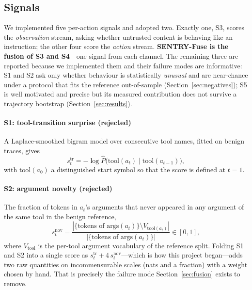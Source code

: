 \documentclass[preprint,12pt,number]{elsarticle}
\theoremstyle{definition}
\begin{document}
\subsection{Signals}\label{sec:signals}

We implemented five per-action signals and adopted two. Exactly one, S3, scores the
\emph{observation} stream, asking whether untrusted content is behaving like an
instruction; the other four score the \emph{action} stream.
\textbf{SENTRY-Fuse is the fusion of S3 and S4}---one signal from each channel.
The remaining three are reported because we implemented them and their failure
modes are informative: S1 and S2 ask only whether behaviour is statistically \emph{unusual}
and are near-chance under a protocol that fits the reference out-of-sample
(Section~\ref{sec:negatives}); S5 is well motivated and precise but its measured
contribution does not survive a trajectory bootstrap (Section~\ref{sec:results}).

\paragraph{S1: tool-transition surprise (rejected)}
A Laplace-smoothed bigram model over consecutive tool names, fitted on benign
traces, gives
\begin{equation}
s^{\mathrm{tr}}_t = -\log \hat{P}\big(\mathrm{tool}(a_t) \mid \mathrm{tool}(a_{t-1})\big),
\end{equation}
with $\mathrm{tool}(a_0)$ a distinguished start symbol so that the score is
defined at $t=1$.

\paragraph{S2: argument novelty (rejected)}
The fraction of tokens in $a_t$'s arguments that never appeared in any argument of
the same tool in the benign reference,
\begin{equation}
s^{\mathrm{nov}}_t = \frac{|\{\text{tokens of } \mathrm{args}(a_t)\} \setminus
V_{\mathrm{tool}(a_t)}|}{|\{\text{tokens of } \mathrm{args}(a_t)\}|} \in [0,1],
\end{equation}
where $V_{\mathrm{tool}}$ is the per-tool argument vocabulary of the reference
split. Folding S1 and S2 into a single score as
$s^{\mathrm{tr}}_t + 4\,s^{\mathrm{nov}}_t$---which is how this project began---adds
two raw quantities on incommensurable scales (nats and a fraction) with a weight
chosen by hand. That
is precisely the failure mode Section~\ref{sec:fusion} exists to remove.
\end{document}
